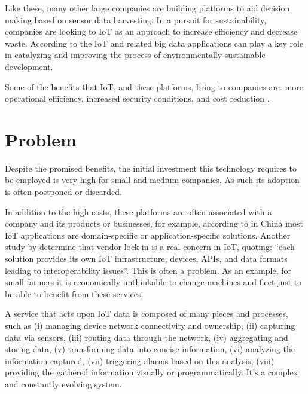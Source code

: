 Like these, many other large companies are building platforms to aid decision making based on sensor data harvesting.
In a pursuit for sustainability, companies are looking to \gls{IoT} as an approach to increase efficiency and decrease waste. According to \cite{BIBRI2018230} the \gls{IoT} and related big data applications can play a key role in catalyzing and improving the process of environmentally sustainable development.

Some of the benefits that \gls{IoT}, and these platforms, bring to companies are: more operational efficiency, increased security conditions, and cost reduction \parencite{forbes-why-iot}.

\section{Problem}
\label{sec:introduction:problem}

Despite the promised benefits, the initial investment this technology requires to be employed is very high for small and medium companies. As such its adoption is often postponed or discarded.

In addition to the high costs, these platforms are often associated with a company and its products or businesses, for example, according to \cite{6851114} in China most \gls{IoT} applications are domain-specific or application-specific solutions. Another study by \cite{noura2019interoperability} determine that vendor lock-in is a real concern in \gls{IoT}, quoting: ``each solution provides its own IoT infrastructure, devices, APIs, and data formats leading to interoperability issues''.
This is often a problem. As an example, for small farmers it is economically unthinkable to change machines and fleet just to be able to benefit from these services.

A service that acts upon \gls{IoT} data is composed of many pieces and processes, such as (i) managing device network connectivity and ownership, (ii) capturing data via sensors, (iii) routing data through the network, (iv) aggregating and storing data, (v) transforming data into concise information, (vi)  analyzing the information captured, (vii) triggering alarms based on this analysis, (viii) providing the gathered information visually or programmatically. It's a complex and constantly evolving system.

